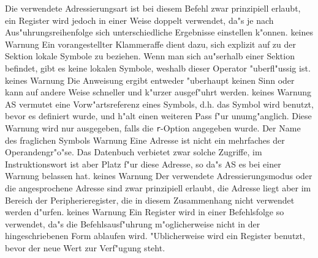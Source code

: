 \documentclass[12pt,a4paper,twoside]{report}
\newcommand{\tty}[1]{{\tt #1}}
\begin{document}
\begin{description}
               {Die verwendete Adressierungsart ist bei
                diesem Befehl zwar prinzipiell erlaubt, ein Register
                wird jedoch in einer Weise doppelt verwendet, da"s je
                nach Aus"uhrungsreihenfolge sich unterschiedliche
                Ergebnisse einstellen k"onnen.}
               {keines}
               {Warnung}
               {Ein vorangestellter Klammeraffe dient
                dazu, sich explizit auf zu der Sektion lokale Symbole
                zu beziehen.  Wenn man sich au"serhalb einer Sektion
                befindet, gibt es keine lokalen Symbole, weshalb dieser
                Operator "uberfl"ussig ist.}
               {keines}
               {Warnung}
               {Die Anweisung ergibt entweder "uberhaupt
                keinen Sinn oder kann auf andere Weise schneller und k"urzer
                ausgef"uhrt werden.}
               {keines}
               {Warnung}
               {AS vermutet eine Vorw"artsreferenz eines
                Symbols, d.h. das Symbol wird benutzt, bevor es definiert
                wurde, und h"alt einen weiteren Pass f"ur unumg"anglich.
                Diese Warnung wird nur ausgegeben, falls die \tty{r}-Option
                angegeben wurde.}
               {Der Name des fraglichen Symbols}
               {Warnung}
               {Eine Adresse ist nicht ein mehrfaches der
                Operandengr"o"se.  Das Datenbuch verbietet zwar solche Zugriffe,
                im Instruktionswort ist aber Platz f"ur diese Adresse, so da"s
                AS es bei einer Warnung belassen hat.}
               {keines}
               {Warnung}
               {Der verwendete Adressierungsmodus oder die
                angesprochene Adresse sind zwar prinzipiell erlaubt, die
                Adresse liegt aber im Bereich der Peripherieregister, die in
                diesem Zusammenhang nicht verwendet werden d"urfen.}
               {keines}
               {Warnung}
               {Ein Register wird in einer Befehlsfolge so
                verwendet, da"s die Befehlsausf"uhrung m"oglicherweise nicht
                in der hingeschriebenen Form ablaufen wird.  "Ublicherweise
                wird ein Register benutzt, bevor der neue Wert zur Verf"ugung
                steht.}

\end{description}
\end{document}
